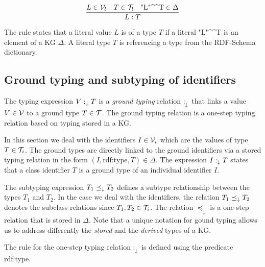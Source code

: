 \documentclass[runningheads]{llncs}
\newcommand{\darr}{\downarrow}
\newcommand{\V}{{\cal V}}
\newcommand{\T}{{\cal T}}
\newcommand{\memo}[1]{}
\newcommand{\notes}[1]{\noindent\begin{small}-- \emph{#1}\hfill\break\end{small}}
\begin{document}
\begin{equation}
\dfrac{L\in\V_l\quad T\in\T_l\quad \text{"L"\textasciicircum\textasciicircum\/T}\in\Delta}
      {L:T}  
\end{equation}

The rule states that a literal value $L$ is of a type $T$ if a literal
"L"\textasciicircum\textasciicircum\/T is an element of a KG
$\Delta$. A literal type $T$ is referencing a type from the RDF-Schema
dictionary.






\subsection{Ground typing and subtyping of identifiers\label{sec:idents-stored}}

The typing expression $V:_\darr\/T$ is a \emph{ground typing} relation
$:_\darr$ that links a value $V\in\V$ to a ground type $T\in\T$. The
ground typing relation is a one-step typing relation based on typing
stored in a KG.

In this section we deal with the identifiers $I\in\V_i$ which are the
values of type $T\in\T_i$. The ground types are directly linked to the
ground identifiers via a stored typing relation in the form
$(I,\text{rdf:type},T)\in\Delta$. The expression $I:_\darr\/T$ states that a
class identifier $T$ is a ground type of an individual identifier $I$.

The subtyping expression $T_1\preceq_\darr\/T_2$ defines a subtype
relationship between the types $T_1$ and $T_2$. In the case we deal
with the identifiers, the relation $T_1\preceq_\darr\/T_2$ denotes the
subclass relations since $T_1,T_2\in\T_i$. The relation $\preceq_\darr$ is
a one-step relation that is stored in $\Delta$. Note that a unique
notation for gound typing allows us to address differently the
\emph{stored} and the \emph{derived} types of a KG.


\memo{Oportunity to introduce ``mixed'' objects including ground and schema components.}

The rule for the one-step typing relation $:_\darr$ is defined using the
predicate rdf:type.
\end{document}
